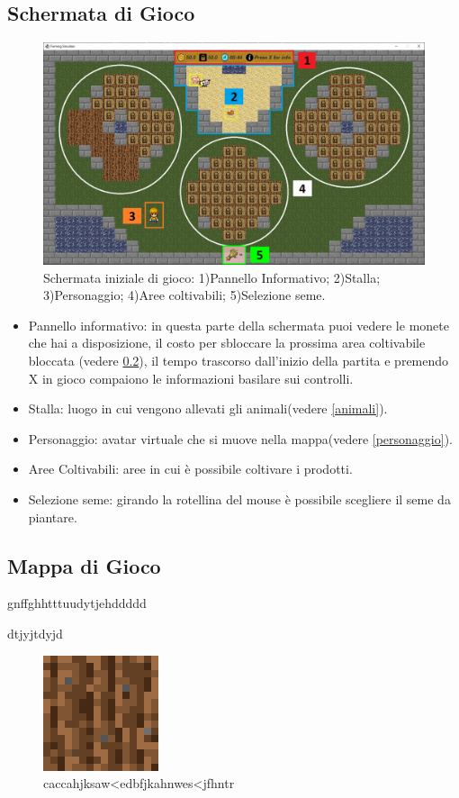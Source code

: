 \documentclass[a4paper,12pt]{report}
\begin{document}
\subsection{Schermata di Gioco}
\begin{figure}[!htb]
	\centerline{\includegraphics[width=\textwidth]{img/SchermataPrincipale.png}}
	\caption{Schermata iniziale di gioco: 1)Pannello Informativo; 2)Stalla; 3)Personaggio; 4)Aree coltivabili; 5)Selezione seme. }
	\label{img:schermata}
\end{figure}
\begin{itemize}
	\item[1)] Pannello informativo: in questa parte della schermata puoi vedere le monete che hai a disposizione, il costo per sbloccare la prossima area coltivabile bloccata (vedere \cref{mappa}), il tempo trascorso dall'inizio della partita e premendo X in gioco compaiono le informazioni basilare sui controlli.
	\item[2)] Stalla: luogo in cui vengono allevati gli animali(vedere \cref{animali}).
	\item[3)] Personaggio: avatar virtuale che si muove nella mappa(vedere \cref{personaggio}).
	\item[4)] Aree Coltivabili: aree in cui è possibile coltivare i prodotti.
	\item[5)] Selezione seme: girando la rotellina del mouse è possibile scegliere il seme da piantare.
\end{itemize}
\subsection{Mappa di Gioco}
		\label{mappa}
		gnffghhtttuudytjehddddd
		
		dtjyjtdyjd
	\begin{figure} 
		\includegraphics[scale=0.5]{img/farmland.png}
		\caption{caccahjksaw<edbfjkahnwes<jfhntr}
	\end{figure}
\end{document}

